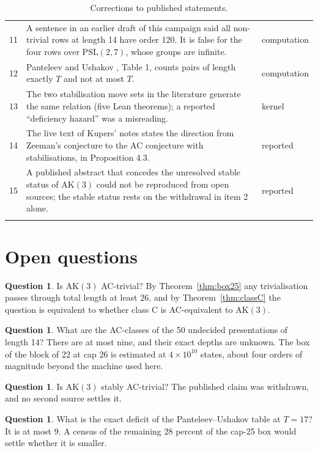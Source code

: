 \documentclass[11pt,a4paper]{article}
\theoremstyle{definition}
\newtheorem{question}[theorem]{Question}
\newcommand{\AK}{\mathrm{AK}}
\begin{document}
\begin{longtable}{p{}p{}p{}}
11 & A sentence in an earlier draft of this campaign said all non-trivial rows at length 14 have order 120. It is false for the four rows over $\mathrm{PSL}(2,7)$, whose groups are infinite. & computation \\
12 & Panteleev and Ushakov \cite{PU19}, Table 1, counts pairs of length exactly $T$ and not at most $T$. & computation \\
13 & The two stabilisation move sets in the literature generate the same relation (five Lean theorems); a reported ``deficiency hazard'' was a misreading. & kernel \\
14 & The live text of Kupers' notes states the direction from Zeeman's conjecture to the AC conjecture with stabilisations, in Proposition 4.3. & reported \\
15 & A published abstract that concedes the unresolved stable status of $\AK(3)$ could not be reproduced from open sources; the stable status rests on the withdrawal in item 2 alone. & reported \\
\bottomrule
\caption{Corrections to published statements.}
\label{tab:corr}
\end{longtable}

\section{Open questions}\label{sec:open}

\begin{question}
Is $\AK(3)$ AC-trivial? By Theorem~\ref{thm:box25} any trivialisation passes through total length at least 26, and by Theorem~\ref{thm:classC} the question is equivalent to whether class C is AC-equivalent to $\AK(3)$.
\end{question}

\begin{question}
What are the AC-classes of the 50 undecided presentations of length 14? There are at most nine, and their exact depths are unknown. The box of the block of 22 at cap 26 is estimated at $4\times10^{10}$ states, about four orders of magnitude beyond the machine used here.
\end{question}

\begin{question}
Is $\AK(3)$ stably AC-trivial? The published claim was withdrawn, and no second source settles it.
\end{question}

\begin{question}
What is the exact deficit of the Panteleev--Ushakov table at $T=17$? It is at most 9. A census of the remaining 28 percent of the cap-25 box would settle whether it is smaller.
\end{question}
\end{document}
